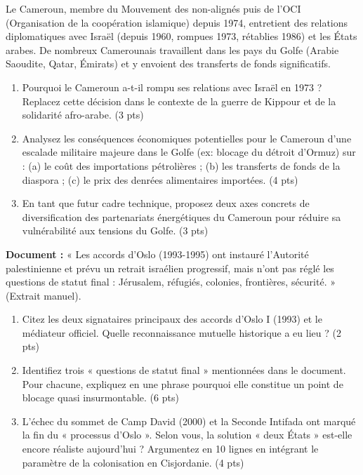 \documentclass[11pt]{article}
\begin{document}
\begin{exercice}
Le Cameroun, membre du Mouvement des non-alignés puis de l'OCI (Organisation de la coopération islamique) depuis 1974, entretient des relations diplomatiques avec Israël (depuis 1960, rompues 1973, rétablies 1986) et les États arabes. De nombreux Camerounais travaillent dans les pays du Golfe (Arabie Saoudite, Qatar, Émirats) et y envoient des transferts de fonds significatifs.

\begin{enumerate}
    \item Pourquoi le Cameroun a-t-il rompu ses relations avec Israël en 1973 ? Replacez cette décision dans le contexte de la guerre de Kippour et de la solidarité afro-arabe. (3 pts)
    \item Analysez les conséquences économiques potentielles pour le Cameroun d'une escalade militaire majeure dans le Golfe (ex: blocage du détroit d'Ormuz) sur : (a) le coût des importations pétrolières ; (b) les transferts de fonds de la diaspora ; (c) le prix des denrées alimentaires importées. (4 pts)
    \item En tant que futur cadre technique, proposez deux axes concrets de diversification des partenariats énergétiques du Cameroun pour réduire sa vulnérabilité aux tensions du Golfe. (3 pts)
\end{enumerate}
\end{exercice}

\begin{exercice}
\textbf{Document :} « Les accords d'Oslo (1993-1995) ont instauré l'Autorité palestinienne et prévu un retrait israélien progressif, mais n'ont pas réglé les questions de statut final : Jérusalem, réfugiés, colonies, frontières, sécurité. » (Extrait manuel).

\begin{enumerate}
    \item Citez les deux signataires principaux des accords d'Oslo I (1993) et le médiateur officiel. Quelle reconnaissance mutuelle historique a eu lieu ? (2 pts)
    \item Identifiez trois « questions de statut final » mentionnées dans le document. Pour chacune, expliquez en une phrase pourquoi elle constitue un point de blocage quasi insurmontable. (6 pts)
    \item L'échec du sommet de Camp David (2000) et la Seconde Intifada ont marqué la fin du « processus d'Oslo ». Selon vous, la solution « deux États » est-elle encore réaliste aujourd'hui ? Argumentez en 10 lignes en intégrant le paramètre de la colonisation en Cisjordanie. (4 pts)
\end{enumerate}
\end{exercice}
\end{document}
